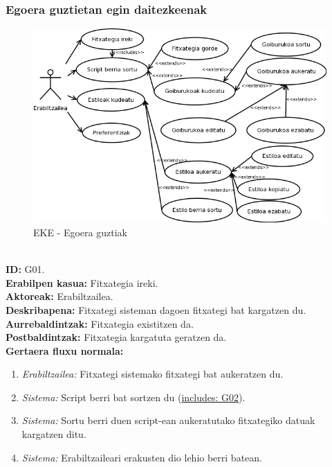 \subsubsection{Egoera guztietan egin daitezkeenak}
\begin{figure}[htp]
\begin{center}
\includegraphics[scale=0.6]{Pictures/Chapter4/Analisia/EKE-Guztiak.png}
\caption{EKE - Egoera guztiak}
\label{eke-guztiak}
\end{center}
\end{figure}
\noindent\\
\textbf{ID:} G01.\\
\textbf{Erabilpen kasua:} Fitxategia ireki.\\
\textbf{Aktoreak:} Erabiltzailea.\\
\textbf{Deskribapena:} Fitxategi sisteman dagoen fitxategi bat kargatzen du.\\
\textbf{Aurrebaldintzak:} Fitxategia existitzen da.\\
\textbf{Postbaldintzak:} Fitxategia kargatuta geratzen da.\\
\textbf{Gertaera fluxu normala:}
\begin{enumerate}
	\item \textit{Erabiltzailea:} Fitxategi sistemako fitxategi bat aukeratzen du.
	\item \textit{Sistema:} Script berri bat sortzen du (\underline{includes: G02}).
	\item \textit{Sistema:} Sortu berri duen script-ean aukeratutako fitxategiko datuak kargatzen ditu.
	\item \textit{Sistema:} Erabiltzaileari erakusten dio lehio berri batean.
\end{enumerate}

